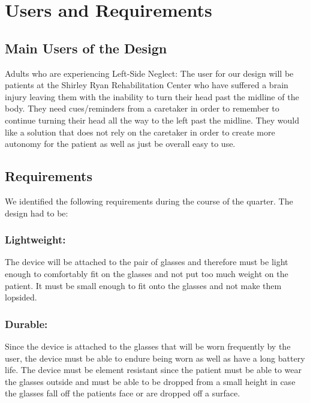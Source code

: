 \chapter{Users and Requirements}
\label{chap:users}

\section{Main Users of the Design}

Adults who are experiencing Left-Side Neglect: The user for our design will be patients at the Shirley Ryan Rehabilitation Center who have suffered a brain injury leaving them with the inability to turn their head past the midline of the body. They need cues/reminders from a caretaker in order to remember to continue turning their head all the way to the left past the midline. They would like a solution that does not rely on the caretaker in order to create more autonomy for the patient as well as just be overall easy to use. 

\section{Requirements}

We identified the following requirements during the course of the quarter. The design had to be: 

\subsection{Lightweight:}
The device will be attached to the pair of glasses and therefore must be light enough to comfortably fit on the glasses and not put too much weight on the patient. It must be small enough to fit onto the glasses and not make them lopsided. 

\subsection{Durable:}
Since the device is attached to the glasses that will be worn frequently by the user, the device must be able to endure being worn as well as have a long battery life. The device must be element resistant since the patient must be able to wear the glasses outside and must be able to be dropped from a small height in case the glasses fall off the patients face or are dropped off a surface. 

